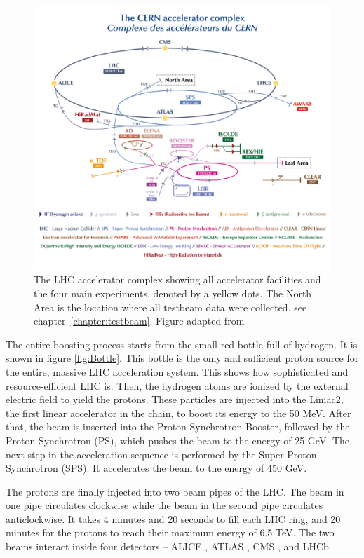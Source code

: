 \begin{figure}
\centering
\includegraphics{figures/LHC.png}
\caption{The LHC accelerator complex showing all accelerator facilities and the four main experiments, denoted by a yellow dots. The North Area is the location where all testbeam data were collected, see chapter~\ref{chapter:testbeam}. Figure adapted from \cite{LHC_complex}
\label{fig:LHC}}
\end{figure}

The entire boosting process starts from the small red bottle full of hydrogen. It is shown in figure \ref{fig:Bottle}. This bottle is the only and sufficient proton source for the entire, massive LHC acceleration system. This shows how sophisticated and resource-efficient LHC is. Then, the hydrogen atoms are ionized by the external electric field to yield the protons. These particles are injected into the Liniac2, the first linear accelerator in the chain, to boost its energy to the 50 MeV. After that, the beam is inserted into the Proton Synchrotron Booster, followed by the Proton Synchrotron (PS), which pushes the beam to the energy of 25 GeV. The next step in the acceleration sequence is performed by the Super Proton Synchrotron (SPS). It accelerates the beam to the energy of 450 GeV.  

The protons are finally injected into two beam pipes of the LHC. The beam in one pipe circulates clockwise while the beam in the second pipe circulates anticlockwise. It takes 4 minutes and 20 seconds to fill each LHC ring, and 20 minutes for the protons to reach their maximum energy of 6.5 TeV. The two beams interact inside four detectors – ALICE \cite{Alice}, ATLAS \cite{Atlas}, CMS \cite{CMS}, and LHCb.

